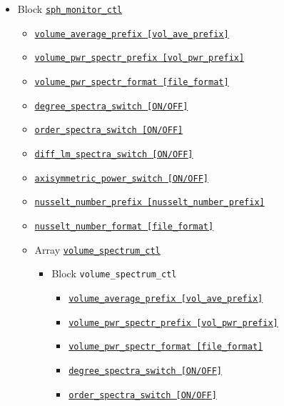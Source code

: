 \begin{itemize}
\begin{itemize}
%
	\end{itemize}
%
\item Block \hyperref[href_t:sph_monitor_ctl]{\tt sph\_monitor\_ctl}
	\begin{itemize} \label{href_i:sph_monitor_ctl}
	\item \hyperref[href_t:volume_average_prefix]
			{\tt volume\_average\_prefix        [vol\_ave\_prefix]}
	\item \hyperref[href_t:volume_pwr_spectr_prefix]
			{\tt volume\_pwr\_spectr\_prefix    [vol\_pwr\_prefix]}
	\item \hyperref[href_t:volume_pwr_spectr_format]
		{\tt volume\_pwr\_spectr\_format    [file\_format]}
	\item \hyperref[href_t:degree_spectra_switch]
		{\tt degree\_spectra\_switch           [ON/OFF]}
	\item \hyperref[href_t:order_spectra_switch]
		{\tt order\_spectra\_switch           [ON/OFF]}
	\item \hyperref[href_t:diff_lm_spectra_switch]
		{\tt diff\_lm\_spectra\_switch           [ON/OFF]}
	\item \hyperref[href_t:axisymmetric_power_switch]
		{\tt axisymmetric\_power\_switch           [ON/OFF]}
%
	\item \hyperref[href_t:nusselt_number_prefix]
			{\tt nusselt\_number\_prefix        [nusselt\_number\_prefix]}
	\item \hyperref[href_t:nusselt_number_format]
			{\tt nusselt\_number\_format    [file\_format]}
%
	\item Array \hyperref[href_t:volume_spectrum_ctl]{\tt volume\_spectrum\_ctl}
		\begin{itemize}
		\item Block \verb|volume_spectrum_ctl|
			\begin{itemize}
			\item \hyperref[href_t:volume_average_prefix]
				{\tt volume\_average\_prefix      [vol\_ave\_prefix]}
			\item \hyperref[href_t:volume_pwr_spectr_prefix]
				{\tt volume\_pwr\_spectr\_prefix  [vol\_pwr\_prefix]}
        	\item \hyperref[href_t:volume_pwr_spectr_format]
		    	{\tt volume\_pwr\_spectr\_format    [file\_format]}
%
			\item \hyperref[href_t:degree_spectra_switch]
				{\tt degree\_spectra\_switch           [ON/OFF]}
			\item \hyperref[href_t:order_spectra_switch]
				{\tt order\_spectra\_switch           [ON/OFF]}

\end{itemize}
\end{itemize}
\end{itemize}
\end{itemize}
